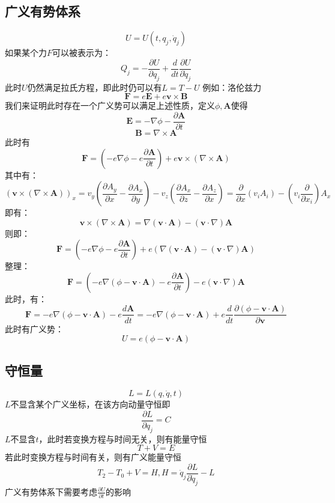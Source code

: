 \documentclass[a4paper, 10pt, openany]{book}%
\begin{document}
    \subsection{广义有势体系}
    $$U=U(t,q_j,\dot{q}_j)$$
    如果某个力$F$可以被表示为：
    $$Q_j=-\frac{\partial U}{\partial q_j}+\frac{d}{dt}\frac{\partial U}{\partial \dot{q}_j}$$
    此时$U$仍然满足拉氏方程，即此时仍可以有$L=T-U$
    例如：洛伦兹力
    $$\textbf{F}=e\textbf{E}+e\textbf{v}\times\textbf{B}$$
    我们来证明此时存在一个广义势可以满足上述性质，定义$\phi,\textbf{A}$使得
    $$\textbf{E}=-\nabla\phi-\frac{\partial \textbf{A}}{\partial t}$$
    $$\textbf{B}=\nabla\times\textbf{A}$$
    此时有
    $$\textbf{F}=(-e\nabla\phi-e\frac{\partial \textbf{A}}{\partial t})+e\textbf{v}\times(\nabla\times\textbf{A})$$
    其中有：
    $$(\textbf{v}\times(\nabla\times\textbf{A}))_x=v_y(\frac{\partial A_y}{\partial x}-\frac{\partial A_x}{\partial y})-v_z(\frac{\partial A_x}{\partial z}-\frac{\partial A_z}{\partial x})=\frac{\partial}{\partial x}(v_iA_i)-(v_i\frac{\partial}{\partial x_i})A_x$$
    即有：
    $$\textbf{v}\times(\nabla\times\textbf{A})=\nabla(\textbf{v}\cdot\textbf{A})-(\textbf{v}\cdot\nabla)\textbf{A}$$
    则即：
    $$\textbf{F}=(-e\nabla\phi-e\frac{\partial \textbf{A}}{\partial t})+e(\nabla(\textbf{v}\cdot\textbf{A})-(\textbf{v}\cdot\nabla)\textbf{A})$$
    整理：
    $$\textbf{F}=(-e\nabla(\phi-\textbf{v}\cdot\textbf{A})-e\frac{\partial \textbf{A}}{\partial t})-e(\textbf{v}\cdot\nabla)\textbf{A}$$
    此时，有：
    $$\textbf{F}=-e\nabla(\phi-\textbf{v}\cdot\textbf{A})-e\frac{d \textbf{A}}{d t}=-e\nabla(\phi-\textbf{v}\cdot\textbf{A})+e\frac{d}{d t}\frac{\partial (\phi-\textbf{v}\cdot\textbf{A})}{\partial \textbf{v}}$$
    此时有广义势：
    $$U=e(\phi-\textbf{v}\cdot\textbf{A})$$
    \subsection{守恒量}
    $$L=L(q,\dot{q},t)$$
    $L$不显含某个广义坐标，在该方向动量守恒即
    $$\frac{\partial L}{\partial q_j}=C$$
    $L$不显含$t$，此时若变换方程与时间无关，则有能量守恒
    $$T+V=E$$
    若此时变换方程与时间有关，则有广义能量守恒
    $$T_2-T_0+V=H,H=\dot{q}_j\frac{\partial L}{\partial \dot{q}_j}-L$$
    广义有势体系下需要考虑$\frac{\partial U}{\partial t}$的影响
\end{document}

